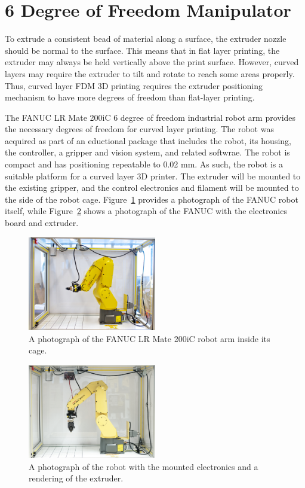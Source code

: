 \section{6 Degree of Freedom Manipulator}

To extrude a consistent bead of material along a surface, the extruder nozzle should be normal to the surface. This means that in flat layer printing, the extruder may always be held vertically above the print surface. However, curved layers may require the extruder to tilt and rotate to reach some areas properly. Thus, curved layer FDM 3D printing requires the extruder positioning mechanism to have more degrees of freedom than flat-layer printing. 

The FANUC LR Mate 200iC 6 degree of freedom industrial robot arm provides the necessary degrees of freedom for curved layer printing. The robot was acquired as part of an eductional package that includes the robot, its housing, the controller, a gripper and vision system, and related softwrae. The robot is compact and has positioning repeatable to 0.02 mm. As such, the robot is a suitable platform for a curved layer 3D printer. The extruder will be mounted to the existing gripper, and the control electronics and filament will be mounted to the side of the robot cage. Figure~\ref{fig:robot} provides a photograph of the FANUC robot itself, while Figure~\ref{fig:robot with things} shows a photograph of the FANUC with the electronics board and extruder.


\begin{figure}[htp]
\centering
\includegraphics[width=0.5\textwidth]{./figures/robot}
\caption{A photograph of the FANUC LR Mate 200iC robot arm inside its cage.}
\label{fig:robot}
\end{figure}

\begin{figure}[htp]
\centering
\includegraphics[width=0.5\textwidth]{./figures/robot-extruder-electronics}
\caption{A photograph of the robot with the mounted electronics and a rendering of the extruder.}
\label{fig:robot with things}
\end{figure}